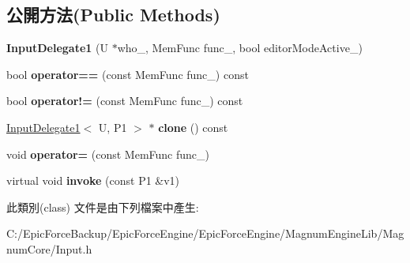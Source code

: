 \subsection*{公開方法(Public Methods)}
\begin{DoxyCompactItemize}
\item 
{\bfseries Input\+Delegate1} (U $\ast$who\+\_\+, Mem\+Func func\+\_\+, bool editor\+Mode\+Active\+\_\+)\hypertarget{class_magnum_1_1_input_1_1_input_delegate1_add45c1e04488779acba75f6f223185f5}{}\label{class_magnum_1_1_input_1_1_input_delegate1_add45c1e04488779acba75f6f223185f5}

\item 
bool {\bfseries operator==} (const Mem\+Func func\+\_\+) const \hypertarget{class_magnum_1_1_input_1_1_input_delegate1_acf8e9406060a9682904170a583b7dcb4}{}\label{class_magnum_1_1_input_1_1_input_delegate1_acf8e9406060a9682904170a583b7dcb4}

\item 
bool {\bfseries operator!=} (const Mem\+Func func\+\_\+) const \hypertarget{class_magnum_1_1_input_1_1_input_delegate1_af00b2a93a1c391642111cd687a7d9a50}{}\label{class_magnum_1_1_input_1_1_input_delegate1_af00b2a93a1c391642111cd687a7d9a50}

\item 
\hyperlink{class_magnum_1_1_input_1_1_input_delegate1}{Input\+Delegate1}$<$ U, P1 $>$ $\ast$ {\bfseries clone} () const \hypertarget{class_magnum_1_1_input_1_1_input_delegate1_a77a9de7a44cda5e8c6062bcb284a19ba}{}\label{class_magnum_1_1_input_1_1_input_delegate1_a77a9de7a44cda5e8c6062bcb284a19ba}

\item 
void {\bfseries operator=} (const Mem\+Func func\+\_\+)\hypertarget{class_magnum_1_1_input_1_1_input_delegate1_a9a20fee250029f1b96e952627371a543}{}\label{class_magnum_1_1_input_1_1_input_delegate1_a9a20fee250029f1b96e952627371a543}

\item 
virtual void {\bfseries invoke} (const P1 \&v1)\hypertarget{class_magnum_1_1_input_1_1_input_delegate1_a1c3f9e26a91cbd5e9d4f4cc72e9b1837}{}\label{class_magnum_1_1_input_1_1_input_delegate1_a1c3f9e26a91cbd5e9d4f4cc72e9b1837}

\end{DoxyCompactItemize}


此類別(class) 文件是由下列檔案中產生\+:\begin{DoxyCompactItemize}
\item 
C\+:/\+Epic\+Force\+Backup/\+Epic\+Force\+Engine/\+Epic\+Force\+Engine/\+Magnum\+Engine\+Lib/\+Magnum\+Core/Input.\+h\end{DoxyCompactItemize}
